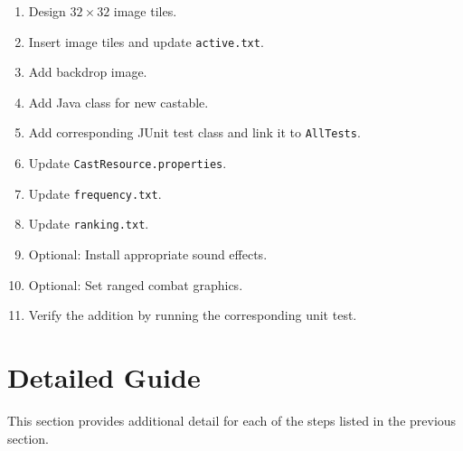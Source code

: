 \documentclass{article}
\begin{document}
\begin{enumerate}

\item Design $32\times32$ image tiles.

\item Insert image tiles and update {\tt active.txt}.

\item Add backdrop image.

\item Add Java class for new castable.

\item Add corresponding JUnit test class and link it to {\tt AllTests}.

\item Update {\tt CastResource.properties}.

\item Update {\tt frequency.txt}.

\item Update {\tt ranking.txt}.

\item Optional: Install appropriate sound effects.

\item Optional: Set ranged combat graphics.

\item Verify the addition by running the corresponding unit test.

\end{enumerate}

\section{Detailed Guide}

This section provides additional detail for each of the steps listed in the previous section.
\end{document}
